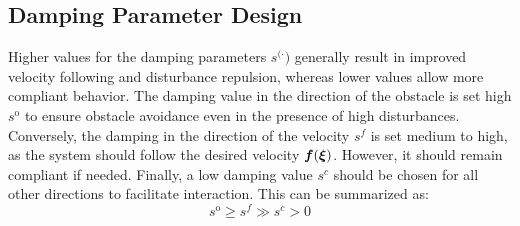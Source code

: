 \subsection{Damping Parameter Design}
Higher values for the damping parameters $s^{(\cdot})$ generally result in improved velocity following and disturbance repulsion, whereas lower values allow more compliant behavior.
The damping value in the direction of the obstacle is set high $s^{\mathrm{o}}$ to ensure obstacle avoidance even in the presence of high disturbances. 
Conversely, the damping in the direction of the velocity $s^{f}$ is set medium to high, as the system should follow the desired velocity $\boldsymbol{f}(\boldsymbol{\xi})$. However, it should remain compliant if needed.
Finally, a low damping value $s^{c}$ should be chosen for all other directions to facilitate interaction.
This can be summarized as:
\begin{equation}
s^{\mathrm{o}} \geq s^{f} \gg s^{c} > 0
\end{equation}
